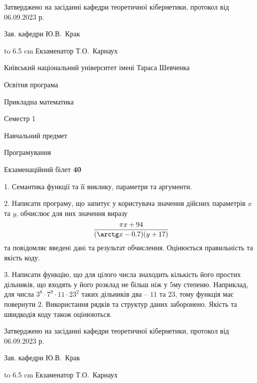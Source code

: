 \documentclass[12pt, ukrainian]{article}
\begin{document}
{\smallskip\smallskip \begin {scriptsize} Затверджено на засіданні кафедри теоретичної кібернетики, протокол   від   06.09.2023 р.\par\smallskip\smallskip\smallskip\smallskip
{\parbox {6.5 cm} {Зав. кафедри \dotfill Ю.В.~Крак}}\hspace {0.7cm} {\hbox to 6.5 cm { Екзаменатор \dotfill Т.О.~Карнаух}} \end{scriptsize}}
\newpage
{{\begin {scriptsize}\par
{ \center  Київський національний університет імені Тараса Шевченка \par}
{\parbox {5 cm}{Освітня програма \hfill}{\parbox {7 cm}{Прикладна математика\hfill}}\parbox {6 cm}{\hfill Семестр 1}}\par
{\parbox {5 cm} {Навчальний предмет \hfill}\parbox {7 cm}{Програмування \hfill}\parbox {6cm}{\hfill}\par}\vspace{-15pt} \end{scriptsize}}{\center Екзаменаційний білет \No \textbf { 40 }\par}}
{%
1. Семантика функції та її виклику, параметри та аргументи.%
\par
2. Написати програму, що запитує у користувача значення дійсних параметрів $x$ та $y$, обчислює для них значення виразу 
$$\frac{\pi x + 94}{(\arctg x - 0.7) (y + 17)}$$ 
та повiдомляє введенi данi та результат обчислення.
 Оцінюється правильність та якість коду.

\par
3. Написати функцію, що для цілого числа знаходить кількість його простих дільників, що входять у його розклад не більш ніж у 5му степеню. Наприклад, для числа $3^8{\cdot}7^9{\cdot}11{\cdot}23^{2}$ таких дільників два – $11$ та $23$, тому функція має повернути $2$.  Використання рядків та структур даних заборонено. Якість та швидкодія коду також оцінюються. 

}
{\smallskip\smallskip \begin {scriptsize} Затверджено на засіданні кафедри теоретичної кібернетики, протокол   від   06.09.2023 р.\par\smallskip\smallskip\smallskip\smallskip
{\parbox {6.5 cm} {Зав. кафедри \dotfill Ю.В.~Крак}}\hspace {0.7cm} {\hbox to 6.5 cm { Екзаменатор \dotfill Т.О.~Карнаух}} \end{scriptsize}}
\vspace{0.9cm}
\end{document}
